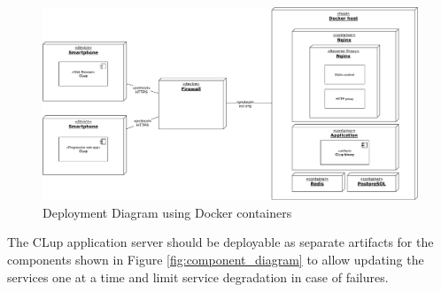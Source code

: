 \begin{figure}[H]
    \centering
    \includegraphics[width=1\textwidth]{Images/deployment-2.pdf}
    \caption{Deployment Diagram using Docker containers}
\end{figure}

The CLup application server should be deployable as separate artifacts for the components shown in Figure \ref{fig:component_diagram} to allow updating the services one at a time and limit service degradation in case of failures.


